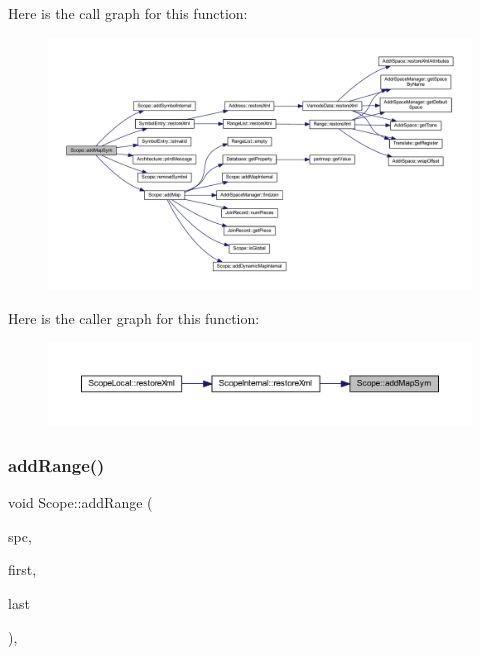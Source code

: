 Here is the call graph for this function\+:
\nopagebreak
\begin{figure}[H]
\begin{center}
\leavevmode
\includegraphics[width=350pt]{class_scope_a421f1b66be24bd5a20c77761e7a51268_cgraph}
\end{center}
\end{figure}
Here is the caller graph for this function\+:
\nopagebreak
\begin{figure}[H]
\begin{center}
\leavevmode
\includegraphics[width=350pt]{class_scope_a421f1b66be24bd5a20c77761e7a51268_icgraph}
\end{center}
\end{figure}
\mbox{\label{class_scope_a33adf8d24b5e22aa420b840b817131e0}} 
\subsubsection{\texorpdfstring{addRange()}{addRange()}}
{\footnotesize\ttfamily void Scope\+::add\+Range (\begin{DoxyParamCaption}\item[{\mbox{\hyperlink{class_addr_space}{Addr\+Space}} $\ast$}]{spc,  }\item[{\mbox{\hyperlink{types_8h_a2db313c5d32a12b01d26ac9b3bca178f}{uintb}}}]{first,  }\item[{\mbox{\hyperlink{types_8h_a2db313c5d32a12b01d26ac9b3bca178f}{uintb}}}]{last }\end{DoxyParamCaption})\hspace{0.3cm}{\ttfamily [protected]}, {\ttfamily [virtual]}}



